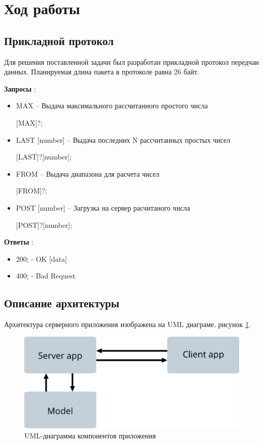 \documentclass[a4paper,14pt]{extarticle}
\begin{document}
\section{Ход работы}
\subsection{Прикладной протокол}
Для решения поставленной задачи был разработан прикладной протокол передчаи данных. Планируемая длина пакета в протоколе равна 26 байт.

\textbf{Запросы} :
\begin{itemize}
\item	MAX -- Выдача максимального рассчитанного простого числа

	[MAX]?;


\item	LAST [number] -- Выдача последних N рассчитанных простых чисел

	[LAST]?[number];


\item	FROM -- Выдача диапазона для расчета чисел

	[FROM]?;

	
\item	POST [number] -- Загрузка на сервер расчитаного числа

	[POST]?[number];

\end{itemize}

\textbf{Ответы} :
\begin{itemize}
\item	200;  - OK [data]

\item	400; - Bad Request
\end{itemize}

\subsection{Описание архитектуры}
Архитектура серверного приложения изображена на UML диаграме, рисунок \ref{uml-1}.
\begin{figure}[H]
	\begin{center}
		\includegraphics[scale=0.6]{pics/1}
		\caption{UML-диаграмма компонентов приложения}
		\label{uml-1}
	\end{center}
\end{figure}
\end{document}
